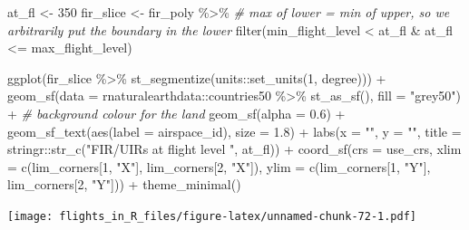 \documentclass[
]{book}
\newenvironment{Shaded}{\begin{snugshade}}{\end{snugshade}}
\newcommand{\AttributeTok}[1]{\textcolor[rgb]{0.77,0.63,0.00}{#1}}
\newcommand{\CommentTok}[1]{\textcolor[rgb]{0.56,0.35,0.01}{\textit{#1}}}
\newcommand{\DecValTok}[1]{\textcolor[rgb]{0.00,0.00,0.81}{#1}}
\newcommand{\FloatTok}[1]{\textcolor[rgb]{0.00,0.00,0.81}{#1}}
\newcommand{\FunctionTok}[1]{\textcolor[rgb]{0.00,0.00,0.00}{#1}}
\newcommand{\NormalTok}[1]{#1}
\newcommand{\OtherTok}[1]{\textcolor[rgb]{0.56,0.35,0.01}{#1}}
\newcommand{\SpecialCharTok}[1]{\textcolor[rgb]{0.00,0.00,0.00}{#1}}
\newcommand{\StringTok}[1]{\textcolor[rgb]{0.31,0.60,0.02}{#1}}
\begin{document}
\begin{Shaded}
\begin{Highlighting}[]
\NormalTok{at\_fl }\OtherTok{\textless{}{-}} \DecValTok{350}
\NormalTok{fir\_slice }\OtherTok{\textless{}{-}}\NormalTok{ fir\_poly }\SpecialCharTok{\%\textgreater{}\%} 
  \CommentTok{\# max of lower = min of upper, so we arbitrarily put the boundary in the lower}
  \FunctionTok{filter}\NormalTok{(min\_flight\_level }\SpecialCharTok{\textless{}}\NormalTok{ at\_fl }\SpecialCharTok{\&}\NormalTok{ at\_fl }\SpecialCharTok{\textless{}=}\NormalTok{ max\_flight\_level)}

\FunctionTok{ggplot}\NormalTok{(fir\_slice }\SpecialCharTok{\%\textgreater{}\%} 
         \FunctionTok{st\_segmentize}\NormalTok{(units}\SpecialCharTok{::}\FunctionTok{set\_units}\NormalTok{(}\DecValTok{1}\NormalTok{, degree))) }\SpecialCharTok{+}
  \FunctionTok{geom\_sf}\NormalTok{(}\AttributeTok{data =}\NormalTok{ rnaturalearthdata}\SpecialCharTok{::}\NormalTok{countries50 }\SpecialCharTok{\%\textgreater{}\%} 
            \FunctionTok{st\_as\_sf}\NormalTok{(),}
          \AttributeTok{fill =} \StringTok{"grey50"}\NormalTok{) }\SpecialCharTok{+} \CommentTok{\# background colour for the land}
  \FunctionTok{geom\_sf}\NormalTok{(}\AttributeTok{alpha =} \FloatTok{0.6}\NormalTok{) }\SpecialCharTok{+}
  \FunctionTok{geom\_sf\_text}\NormalTok{(}\FunctionTok{aes}\NormalTok{(}\AttributeTok{label =}\NormalTok{ airspace\_id), }\AttributeTok{size =} \FloatTok{1.8}\NormalTok{) }\SpecialCharTok{+}
  \FunctionTok{labs}\NormalTok{(}\AttributeTok{x =} \StringTok{""}\NormalTok{, }\AttributeTok{y =} \StringTok{""}\NormalTok{,}
       \AttributeTok{title =}\NormalTok{ stringr}\SpecialCharTok{::}\FunctionTok{str\_c}\NormalTok{(}\StringTok{"FIR/UIRs at flight level "}\NormalTok{, at\_fl)) }\SpecialCharTok{+}
  \FunctionTok{coord\_sf}\NormalTok{(}\AttributeTok{crs =}\NormalTok{ use\_crs, }
           \AttributeTok{xlim =} \FunctionTok{c}\NormalTok{(lim\_corners[}\DecValTok{1}\NormalTok{, }\StringTok{"X"}\NormalTok{], lim\_corners[}\DecValTok{2}\NormalTok{, }\StringTok{"X"}\NormalTok{]), }
           \AttributeTok{ylim =} \FunctionTok{c}\NormalTok{(lim\_corners[}\DecValTok{1}\NormalTok{, }\StringTok{"Y"}\NormalTok{], lim\_corners[}\DecValTok{2}\NormalTok{, }\StringTok{"Y"}\NormalTok{])) }\SpecialCharTok{+}
  \FunctionTok{theme\_minimal}\NormalTok{()}
\end{Highlighting}
\end{Shaded}

\texttt{[image: flights\_in\_R\_files/figure-latex/unnamed-chunk-72-1.pdf]}
\end{document}
